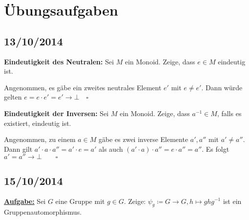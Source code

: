 \documentclass[10pt,a4paper]{article}
\begin{document}

\newpage
\section{Übungsaufgaben}

\subsection{13/10/2014}

\textbf{Eindeutigkeit des Neutralen:} Sei $M$ ein Monoid. Zeige, dass $e \in M$ eindeutig ist.\bigskip

Angenommen, es gäbe ein zweites neutrales Element $e'$ mit $e \neq e'$. Dann würde gelten $e = e \cdot e' = e' \rightarrow \bot \quad \square$\bigskip

\textbf{Eindeutigkeit der Inversen:} Sei $M$ ein Monoid. Zeige, dass $a^{-1} \in M$, falls es existiert, eindeutig ist.\bigskip

Angenommen, zu einem $a \in M$ gäbe es zwei inverse Elemente $a', a''$ mit $a' \neq a''$. Dann gilt $a' \cdot a \cdot a''= a' \cdot e = a'$ als auch $(a' \cdot a) \cdot a'' = e \cdot a'' = a''$. Es folgt $a' = a'' \rightarrow \bot \qquad \square$

\subsection{15/10/2014}

\textbf{\underline{Aufgabe:}} Sei $G$ eine Gruppe mit $g \in G$. Zeige: $\psi_g \coloneqq G \to G, h \mapsto g h g^{-1}$ ist ein Gruppenautomorphismus.
\end{document}
